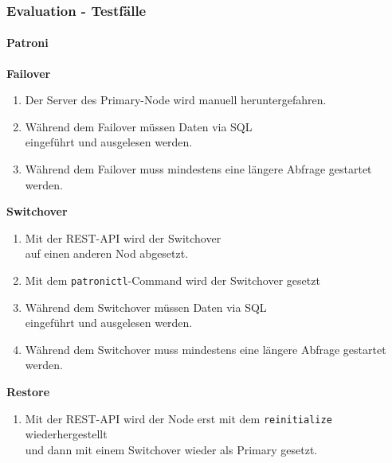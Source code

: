 
\begin{flushleft}
    \subsubsection{Evaluation - Testfälle}
    \paragraph{Patroni}
    \begin{description}
        \item \textbf{Failover}\hfill \\
        \begin{enumerate}
            \item Der Server des Primary-Node wird manuell heruntergefahren.
            \item Während dem Failover müssen Daten via SQL\\eingeführt und ausgelesen werden.
            \item Während dem Failover muss mindestens eine längere Abfrage gestartet werden.
        \end{enumerate}
        \item \textbf{Switchover}\hfill \\
        \begin{enumerate}[resume]
            \item Mit der REST-API wird der Switchover\\auf einen anderen Nod abgesetzt.
            \item Mit dem \texttt{patronictl}-Command wird der Switchover gesetzt
            \item Während dem Switchover müssen Daten via SQL\\eingeführt und ausgelesen werden.
            \item Während dem Switchover muss mindestens eine längere Abfrage gestartet werden.
        \end{enumerate}
        \item \textbf{Restore}\hfill \\
        \begin{enumerate}[resume]
            \item Mit der REST-API wird der Node erst mit dem \texttt{reinitialize} wiederhergestellt\\und dann mit einem Switchover wieder als Primary gesetzt.

\end{enumerate}
\end{description}
\end{flushleft}
